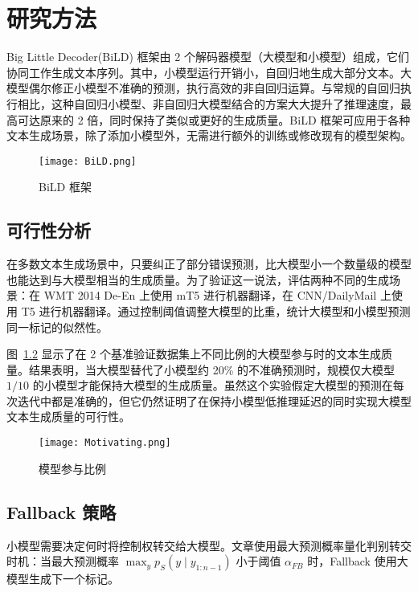 \chapter{研究方法}

Big Little Decoder(BiLD) 框架由 2 个解码器模型（大模型和小模型）组成，它们协同工作生成文本序列。其中，小模型运行开销小，自回归地生成大部分文本。大模型偶尔修正小模型不准确的预测，执行高效的非自回归运算。与常规的自回归执行相比，这种自回归小模型、非自回归大模型结合的方案大大提升了推理速度，最高可达原来的 2 倍，同时保持了类似或更好的生成质量。BiLD 框架可应用于各种文本生成场景，除了添加小模型外，无需进行额外的训练或修改现有的模型架构。

\begin{figure}[htbp]
    \centering
    \texttt{[image: BiLD.png]}
    \caption{BiLD 框架}
    \label{fig:BilD}
\end{figure}

\section{可行性分析}

在多数文本生成场景中，只要纠正了部分错误预测，比大模型小一个数量级的模型也能达到与大模型相当的生成质量。为了验证这一说法，评估两种不同的生成场景：在 WMT 2014 De-En 上使用 mT5 进行机器翻译，在 CNN/DailyMail 上使用 T5 进行机器翻译。通过控制阈值调整大模型的比重，统计大模型和小模型预测同一标记的似然性。

图~\ref*{fig:Motivating} 显示了在 2 个基准验证数据集上不同比例的大模型参与时的文本生成质量。结果表明，当大模型替代了小模型约 20\% 的不准确预测时，规模仅大模型 $1/10$ 的小模型才能保持大模型的生成质量。虽然这个实验假定大模型的预测在每次迭代中都是准确的，但它仍然证明了在保持小模型低推理延迟的同时实现大模型文本生成质量的可行性。

\begin{figure}[htbp]
    \centering
    \texttt{[image: Motivating.png]}
    \caption{模型参与比例}
    \label{fig:Motivating}
\end{figure}

\section{Fallback 策略}

小模型需要决定何时将控制权转交给大模型。文章使用最大预测概率量化判别转交时机：当最大预测概率 $\max _y p_S\left(y \mid y_{1: n-1}\right)$ 小于阈值 $\alpha_{FB}$ 时，Fallback 使用大模型生成下一个标记。

